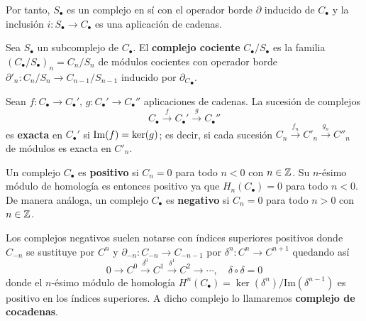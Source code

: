 Por tanto, $S_{\bullet}$ es un complejo en sí con el operador borde $\partial$ inducido de $C_{\bullet}$ y la inclusión $i: S_{\bullet} \rightarrow C_{\bullet}$ es una aplicación de cadenas.

\begin{definicion}
	Sea $S_{\bullet}$ un subcomplejo de $C_{\bullet}$. El \textbf{complejo cociente} $C_{\bullet}/S_{\bullet}$ es la familia $(C_{\bullet}/S_{\bullet})_n = C_n/S_n$ de módulos cocientes con operador borde $\partial'_n: C_n/S_n \rightarrow C_{n-1}/S_{n-1}$ inducido por ${\partial_C}_{\bullet}$.
\end{definicion}

%

\begin{definicion}
Sean \( f: C_{\bullet} \rightarrow C_{\bullet}' \), \( g: C_{\bullet}' \rightarrow C_{\bullet}'' \) aplicaciones de cadenas. La sucesión de complejos \[ C_{\bullet} \xrightarrow{f} C_{\bullet}' \xrightarrow{g} C_{\bullet}'' \] es \textbf{exacta} en \( C_{\bullet}' \) si \( \operatorname{Im}(f) = \ker(g) \); es decir, si cada sucesión \( C_n \xrightarrow{f_n} {C'}_n \xrightarrow{g_n} {C''}_n \) de módulos es exacta en \( {C'}_n \).
\end{definicion}


\begin{definicion}
Un complejo \( C_{\bullet} \) es \textbf{positivo} si \( C_n = 0 \) para todo \( n < 0 \) con $n \in \mathbb{Z}$. Su $n$-ésimo módulo de homología es entonces positivo  ya que \( H_n(C_{\bullet}) = 0 \) para todo \( n < 0 \). De manera análoga, un complejo \( C_{\bullet} \) es \textbf{negativo} si \( C_n = 0 \) para todo \( n > 0 \) con $n \in \mathbb{Z}$.
\end{definicion}

Los complejos negativos suelen notarse con índices superiores positivos donde $C_{-n}$ se sustituye por $C^n$ y $\partial_{-n} : C_{-n} \rightarrow C_{-n-1}$ por $\delta^n: C^n \rightarrow C^{n+1}$ quedando así
\[ 0 \to C^0 \xrightarrow{\delta^0} C^1 \xrightarrow{\delta^1} C^2 \to \cdots, \quad \delta \circ \delta = 0 \]
donde el $n$-ésimo módulo de homología \( H^n(C_{\bullet}) = \ker(\delta^n)/\text{Im}(\delta^{n-1}) \) es positivo en los índices superiores. A dicho complejo lo llamaremos \textbf{complejo de cocadenas}.

